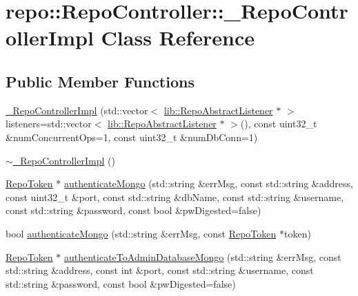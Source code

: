 \hypertarget{class_repo_controller_1_1___repo_controller_impl}{}\section{repo\+:\+:Repo\+Controller\+:\+:\+\_\+\+Repo\+Controller\+Impl Class Reference}
\label{class_repo_controller_1_1___repo_controller_impl}
\subsection*{Public Member Functions}
\begin{DoxyCompactItemize}
\item 
\hyperlink{class_repo_controller_1_1___repo_controller_impl_a3f3c778a5a66db21dae228343c0df2c6}{\+\_\+\+Repo\+Controller\+Impl} (std\+::vector$<$ \hyperlink{classrepo_1_1lib_1_1_repo_abstract_listener}{lib\+::\+Repo\+Abstract\+Listener} $\ast$ $>$ listeners=std\+::vector$<$ \hyperlink{classrepo_1_1lib_1_1_repo_abstract_listener}{lib\+::\+Repo\+Abstract\+Listener} $\ast$ $>$(), const uint32\+\_\+t \&num\+Concurrent\+Ops=1, const uint32\+\_\+t \&num\+Db\+Conn=1)
\item 
\hyperlink{class_repo_controller_1_1___repo_controller_impl_ac501d5b36baa6cac51caf834943aa3c2}{$\sim$\+\_\+\+Repo\+Controller\+Impl} ()
\item 
\hyperlink{class_repo_controller_1_1_repo_token}{Repo\+Token} $\ast$ \hyperlink{class_repo_controller_1_1___repo_controller_impl_af4552a181af4c8923d01e1f5d304f478}{authenticate\+Mongo} (std\+::string \&err\+Msg, const std\+::string \&address, const uint32\+\_\+t \&port, const std\+::string \&db\+Name, const std\+::string \&username, const std\+::string \&password, const bool \&pw\+Digested=false)
\item 
bool \hyperlink{class_repo_controller_1_1___repo_controller_impl_a0a6492d281dd01930584af7166656e8a}{authenticate\+Mongo} (std\+::string \&err\+Msg, const \hyperlink{class_repo_controller_1_1_repo_token}{Repo\+Token} $\ast$token)
\item 
\hyperlink{class_repo_controller_1_1_repo_token}{Repo\+Token} $\ast$ \hyperlink{class_repo_controller_1_1___repo_controller_impl_adcd38275158f9b923eb040ba7c86a6dc}{authenticate\+To\+Admin\+Database\+Mongo} (std\+::string \&err\+Msg, const std\+::string \&address, const int \&port, const std\+::string \&username, const std\+::string \&password, const bool \&pw\+Digested=false)

\end{DoxyCompactItemize}
